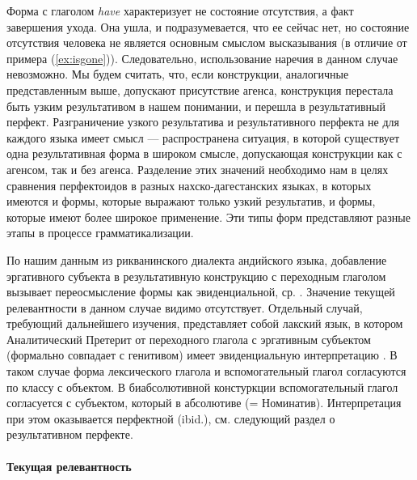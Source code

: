 Форма с глаголом \textit{have} характеризует не состояние отсутствия, а факт завершения ухода. Она ушла, и подразумевается, что ее сейчас нет, но состояние отсутствия человека не является основным смыслом высказывания (в отличие от примера (\ref{ex:isgone})). Следовательно, использование наречия в данном случае невозможно. Мы будем считать, что, если конструкции, аналогичные представленным выше, допускают присутствие агенса, конструкция перестала быть узким результативом в нашем понимании, и перешла в результативный перфект. Разграничение узкого результатива и результативного перфекта не для каждого языка имеет смысл --- распространена ситуация, в которой существует одна результативная форма в широком смысле, допускающая конструкции как с агенсом, так и без агенса. Разделение этих значений необходимо нам в целях сравнения перфектоидов в разных нахско-дагестанских языках, в которых имеются и формы, которые выражают только узкий результатив, и формы, которые имеют более широкое применение. Эти типы форм представляют разные этапы в процессе грамматикализации.
\par По нашим данным из рикванинского диалекта андийского языка, добавление эргативного субъекта в результативную конструкцию с переходным глаголом вызывает переосмысление формы как эвиденциальной, ср. \citep{verhees2018}. Значение текущей релевантности в данном случае видимо отсутствует. Отдельный случай, требующий дальнейшего изучения, представляет собой лакский язык, в котором Аналитический Претерит от переходного глагола с эргативным субъектом (формально совпадает с генитивом) имеет эвиденциальную интерпретацию \citep[362--363]{friedman2007}. В таком случае форма лексического глагола и вспомогательный глагол согласуются по классу с объектом. В биабсолютивной констуркции вспомогательный глагол согласуется с субъектом, который в абсолютиве (= Номинатив). Интерпретация при этом оказывается перфектной (ibid.), см. следующий раздел о результативном перфекте.

\paragraph{Текущая релевантность} \label{sec:cr}

